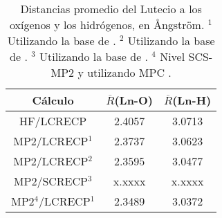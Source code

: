 \begin{table}[h!]
\centering  %
\caption{\footnotesize Distancias promedio del Lutecio a los ox\'igenos
y los hidr\'ogenos, en {\AA}ngstr\"om.
{\footnotesize $^1$ Utilizando la base de \cite{Dolg1993}.} 
{\footnotesize $^2$ Utilizando la base de \cite{Yang2005}.}
{\footnotesize $^3$ Utilizando la base de \cite{Cao2002}.}  
{\footnotesize $^4$ Nivel SCS-MP2 \citep{Grim2003} y utilizando MPC 
\citep{Toma2005}.}}
\begin{tabular}{c|cc}\hline\hline
C\'alculo & $\overline R$(Ln-O) & $\overline R$(Ln-H) \\ \hline
HF/LCRECP & 2.4057 & 3.0713 \\ 
MP2/LCRECP$^1$ & 2.3737 & 3.0623  \\ 
MP2/LCRECP$^2$ & 2.3595 & 3.0477  \\ 
MP2/SCRECP$^3$ & x.xxxx & x.xxxx  \\ 
MP2$^4$/LCRECP$^1$ & 2.3489 & 3.0372  \\ 
\hline \end{tabular}\label{tD9+0}\end{table}
